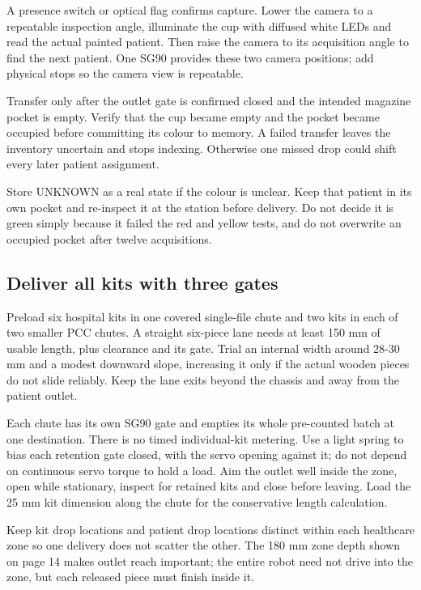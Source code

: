 \documentclass[10pt,a4paper]{article}
\begin{document}
A presence switch or optical flag confirms capture. Lower the camera to a repeatable inspection angle, illuminate the cup with diffused white LEDs and read the actual painted patient. Then raise the camera to its acquisition angle to find the next patient. One SG90 provides these two camera positions; add physical stops so the camera view is repeatable.

Transfer only after the outlet gate is confirmed closed and the intended magazine pocket is empty. Verify that the cup became empty and the pocket became occupied before committing its colour to memory. A failed transfer leaves the inventory uncertain and stops indexing. Otherwise one missed drop could shift every later patient assignment.

Store UNKNOWN as a real state if the colour is unclear. Keep that patient in its own pocket and re-inspect it at the station before delivery. Do not decide it is green simply because it failed the red and yellow tests, and do not overwrite an occupied pocket after twelve acquisitions.

\subsection{Deliver all kits with three gates}
Preload six hospital kits in one covered single-file chute and two kits in each of two smaller PCC chutes. A straight six-piece lane needs at least 150 mm of usable length, plus clearance and its gate. Trial an internal width around 28-30 mm and a modest downward slope, increasing it only if the actual wooden pieces do not slide reliably. Keep the lane exits beyond the chassis and away from the patient outlet.

Each chute has its own SG90 gate and empties its whole pre-counted batch at one destination. There is no timed individual-kit metering. Use a light spring to bias each retention gate closed, with the servo opening against it; do not depend on continuous servo torque to hold a load. Aim the outlet well inside the zone, open while stationary, inspect for retained kits and close before leaving. Load the 25 mm kit dimension along the chute for the conservative length calculation.

Keep kit drop locations and patient drop locations distinct within each healthcare zone so one delivery does not scatter the other. The 180 mm zone depth shown on page 14 makes outlet reach important; the entire robot need not drive into the zone, but each released piece must finish inside it.
\end{document}
